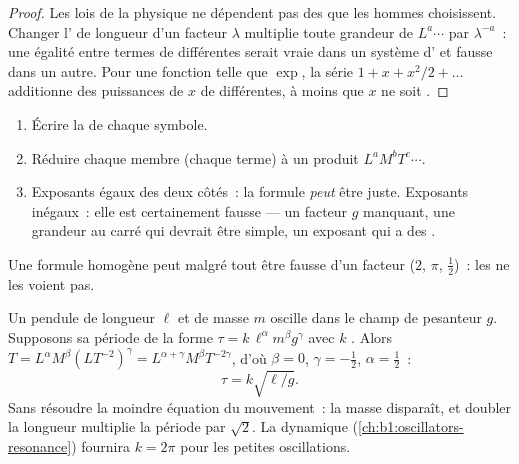 \begin{proof}
Les lois de la physique ne dépendent pas des  que les hommes
choisissent. Changer l' de longueur d'un facteur $\lambda$
multiplie toute grandeur de  $L^a \cdots$ par $\lambda^{-a}$~:
une égalité entre termes de  différentes serait vraie dans un
système d' et fausse dans un autre. Pour une fonction telle que
$\exp$, la série $1 + x + x^2/2 + \dots$ additionne des puissances de
$x$ de  différentes, à moins que $x$ ne soit .
\end{proof}

\begin{method}\label{met:b1:units-dimensions:check}
\begin{enumerate}
  \item Écrire la  de chaque symbole.
  \item Réduire chaque membre (chaque terme) à un produit
        $L^a M^b T^c \cdots$.
  \item Exposants égaux des deux côtés~: la formule \emph{peut} être
        juste. Exposants inégaux~: elle est certainement fausse --- un
        facteur $g$ manquant, une grandeur au carré qui devrait être
        simple, un exposant qui a des .
\end{enumerate}
Une formule homogène peut malgré tout être fausse d'un facteur  ($2$, $\pi$, $\tfrac12$)~: les  ne les voient pas.
\end{method}

\begin{example}\label{ex:b1:units-dimensions:pendulum}
Un pendule de longueur $\ell$ et de masse $m$ oscille dans le champ de
pesanteur $g$. Supposons sa période de la forme
$\tau = k\,\ell^\alpha m^\beta g^\gamma$ avec $k$ . Alors
$T = L^\alpha M^\beta (L T^{-2})^\gamma =
L^{\alpha+\gamma} M^\beta T^{-2\gamma}$, d'où $\beta = 0$,
$\gamma = -\tfrac12$, $\alpha = \tfrac12$~:
\[
\tau = k\sqrt{\ell/g} .
\]
Sans résoudre la moindre équation du mouvement~: la masse disparaît, et
doubler la longueur multiplie la période par $\sqrt2$. La dynamique
(\cref{ch:b1:oscillators-resonance}) fournira $k = 2\pi$ pour les
petites oscillations.
\end{example}

